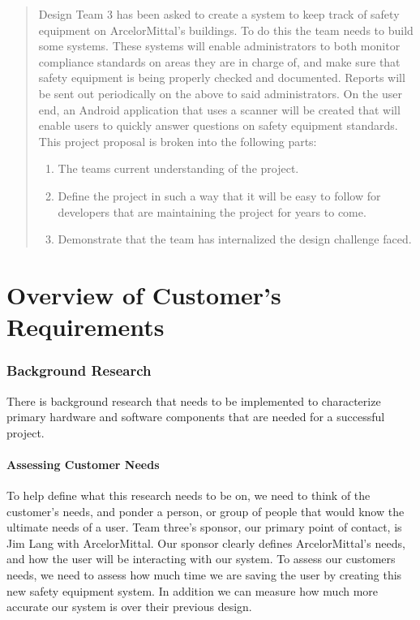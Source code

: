 \documentclass[Letter,11pt]{article}
\begin{document}
	
			\tableofcontents
			\listoffigures
			\begingroup
			\let\clearpage\relax
			\listoftables
			\endgroup
			\newpage
	\begin{abstract}
		Design Team 3 has been asked to create a system to keep track of safety equipment on ArcelorMittal's buildings. To do this the team needs to build some systems. These systems will enable administrators to both monitor compliance standards on areas they are in charge of, and make sure that safety equipment is being properly checked and documented. Reports will be sent out periodically on the above to said administrators.  On the user end, an Android application  that uses a scanner will be created that will enable users to quickly answer questions on safety equipment standards.  This project proposal is broken into the following parts:
		\begin{enumerate}
			\item The teams current understanding of the project.
			\item Define the project in such a way that it will be easy to follow for developers that are maintaining the project for years to come.
			\item Demonstrate that the team has internalized the design challenge faced.
		\end{enumerate}
	\end{abstract}
	

\part{Overview of Customer's Requirements}
\section{Background Research}\label{research}
	There is background research that needs to be implemented to characterize primary hardware and software components that are needed for a successful project. \\
	\subsection{Assessing Customer Needs}
	To help define what this research needs to be on, we need to think of the customer's needs, and ponder a person, or group of people that would know the ultimate needs of a user. Team three's sponsor, our primary point of contact, is Jim Lang with ArcelorMittal. Our sponsor clearly defines ArcelorMittal's needs, and how the user will be interacting with our system. To assess our customers needs, we need to assess how much time we are saving the user by creating this new safety equipment system. In addition we can measure how much more accurate our system is over their previous design. \\ 
\end{document}
